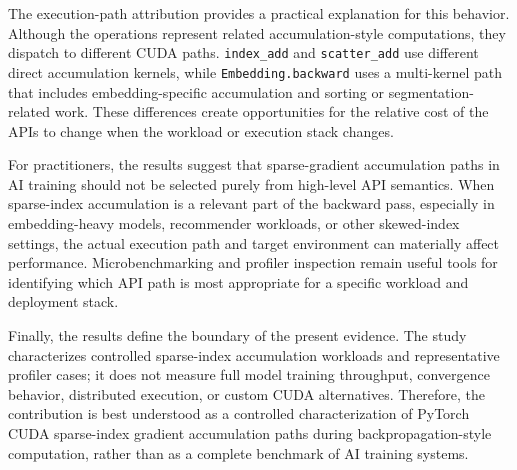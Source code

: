 The execution-path attribution provides a practical explanation for this behavior. Although the operations represent related accumulation-style computations, they dispatch to different CUDA paths. \texttt{index\_add} and \texttt{scatter\_add} use different direct accumulation kernels, while \texttt{Embedding.backward} uses a multi-kernel path that includes embedding-specific accumulation and sorting or segmentation-related work. These differences create opportunities for the relative cost of the APIs to change when the workload or execution stack changes.

For practitioners, the results suggest that sparse-gradient accumulation paths in AI training should not be selected purely from high-level API semantics. When sparse-index accumulation is a relevant part of the backward pass, especially in embedding-heavy models, recommender workloads, or other skewed-index settings, the actual execution path and target environment can materially affect performance. Microbenchmarking and profiler inspection remain useful tools for identifying which API path is most appropriate for a specific workload and deployment stack.

Finally, the results define the boundary of the present evidence. The study characterizes controlled sparse-index accumulation workloads and representative profiler cases; it does not measure full model training throughput, convergence behavior, distributed execution, or custom CUDA alternatives. Therefore, the contribution is best understood as a controlled characterization of PyTorch CUDA sparse-index gradient accumulation paths during backpropagation-style computation, rather than as a complete benchmark of AI training systems.